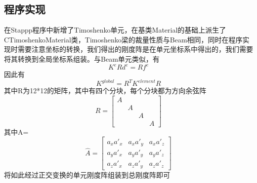 \documentclass[forprint]{WHUBachelor}
\begin{document}
\subsection{程序实现}
在Stappp程序中新增了Timoshenko单元，在基类Material的基础上派生了CTimoshenkoMaterial类，Timoshenko梁的裁量性质与Beam相同，同时在程序实现时需要注意坐标的转换，我们得出的刚度阵是在单元坐标系中得出的，我们需要将其转换到全局坐标系组装。与Beam单元类似，有
\begin{equation} 
K^{e} R d^{e}= R f^{e}
 \end{equation}
因此有
\begin{equation} 
K^{global} = R^T K^{element} R
 \end{equation}
其中R为12*12的矩阵，其中有四个分块，每个分块都为方向余弦阵
\begin{equation} 
R = 
\begin{bmatrix}
A & & & \\
& A & & \\
& & A & \\
& & & A 
\end{bmatrix}
\end{equation}
其中A=
\begin{equation} 
\hat{A}=\left[\begin{array}{lll}{a_{x} a'_{x}} & {a_{x} a'_{y}} & {a_{x} a'_{z}} \\ {a_{y} a'_{x}} & {a_{y} a'_{y}} & {a_{y} a'_{z}} \\ {a_{z} a'_{x}} & {a_{z} a'_{y}} & {a_{z} a'_{z}}\end{array}\right]
 \end{equation}
将如此经过正交变换的单元刚度阵组装到总刚度阵即可
\end{document}

